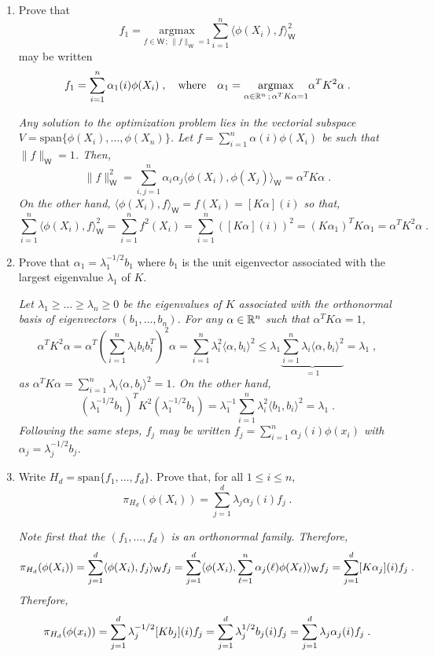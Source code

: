 \begin{enumerate}
\item  Prove that
$$
f_1 =  \underset{f\in \mathsf{W}\,;\,\|f\|_\mathsf{W}=1}{\mathrm{argmax}} \sum_{i=1}^n\langle \phi(X_i),f\rangle_\mathsf{W}^2
$$
may be written
$$
f_1 = \sum_{i=1}^n \alpha_1(i) \phi(X_i)\;,\quad\mbox{where}\quad \alpha_1 =  \underset{\alpha\in \mathbb{R}^n\,;\, \alpha^T K\alpha=1}{\mathrm{argmax}}\alpha^TK^2\alpha\;.
$$

\vspace{.2cm}

{\em
Any solution to the optimization problem lies in the vectorial subspace $V = \mathrm{span}\{\phi(X_i), \ldots,\phi(X_n)\}$.
Let $f = \sum_{i=1}^n \alpha(i)\phi(X_i)$ be such that $\|f\|_{\mathsf{W}}=1$. Then,
$$
\|f\|_{\mathsf{W}}^2 = \sum_{i,j=1}^n \alpha_i\alpha_j \langle \phi(X_i),\phi(X_j)\rangle_\mathsf{W} = \alpha^T K \alpha\;.
$$
On the other hand, $\langle \phi(X_i),f\rangle_\mathsf{W} = f(X_i) = [K\alpha](i)$ so that,
$$
\sum_{i=1}^n\langle \phi(X_i),f\rangle_\mathsf{W}^2 = \sum_{i=1}^nf^2(X_i) = \sum_{i=1}^n  \left([K\alpha](i)\right)^2 = (K\alpha_1)^TK\alpha_1 = \alpha^T K^2 \alpha\;.
$$
}
\item Prove that $\alpha_1 = \lambda_1^{-1/2}b_1$ where $b_1$ is the unit eigenvector associated with the largest eigenvalue $\lambda_1$ of $K$.

\vspace{.2cm}

{\em
Let $\lambda_1\geqslant\ldots\geqslant \lambda_n\ge 0$ be the eigenvalues of $K$ associated with the orthonormal basis of eigenvectors $(b_1,\ldots,b_n)$. For any $\alpha\in\mathbb{R}^n$ such that $\alpha^T K\alpha=1$,
$$
\alpha^T K^2 \alpha = \alpha^T\left(\sum_{i=1}^n\lambda_i b_ib^T_i\right)^2 \alpha = \sum_{i=1}^n \lambda_i^2 \langle \alpha,b_i\rangle^2 \leqslant \lambda_1\underbrace{\sum_{i=1}^n \lambda_i\langle \alpha,b_i\rangle^2}_{=1}= \lambda_1\;,
$$
as $\alpha^T K\alpha = \sum_{i=1}^n \lambda_i\langle \alpha,b_i\rangle^2 = 1$. On the other hand,
$$
\left(\lambda_1^{-1/2}b_1\right)^T K^2 \left(\lambda_1^{-1/2}b_1\right) = \lambda_1^{-1}\sum_{i=1}^n \lambda_i^2 \langle b_1,b_i\rangle^2 = \lambda_1\;.
$$
Following the same steps, $f_j$ may be written $f_j = \sum_{i=1}^n \alpha_j(i)\phi(x_i)$ with $\alpha_j = \lambda^{-1/2}_jb_j$.
}
\item Write $H_d = \mathrm{span}\{f_1,\ldots,f_d\}$. Prove that, for all $1\leqslant i\leqslant n$,
$$
\pi_{H_d}(\phi(X_i)) = \sum_{j=1}^d \lambda_{j}\alpha_j(i)f_j\;.
$$

\vspace{.2cm}

{\em
Note first that the $(f_1,\ldots,f_d)$ is an orthonormal family. Therefore,
$$
\pi_{H_d}(\phi(X_i)) = \sum_{j=1}^d \langle \phi(X_i),f_j\rangle_{\mathsf{W}} f_j = \sum_{j=1}^d \langle \phi(X_i), \sum_{\ell=1}^n \alpha_j(\ell)\phi(X_{\ell})\rangle_{\mathsf{W}} f_j= \sum_{j=1}^d [K\alpha_j](i)f_j\;.
$$
Therefore,
$$
\pi_{H_d}(\phi(x_i)) = \sum_{j=1}^d \lambda^{-1/2}_j[K b_j](i)f_j = \sum_{j=1}^d \lambda^{1/2}_jb_j(i)f_j =  \sum_{j=1}^d \lambda_{j}\alpha_j(i)f_j\;.
$$
}
\end{enumerate}

